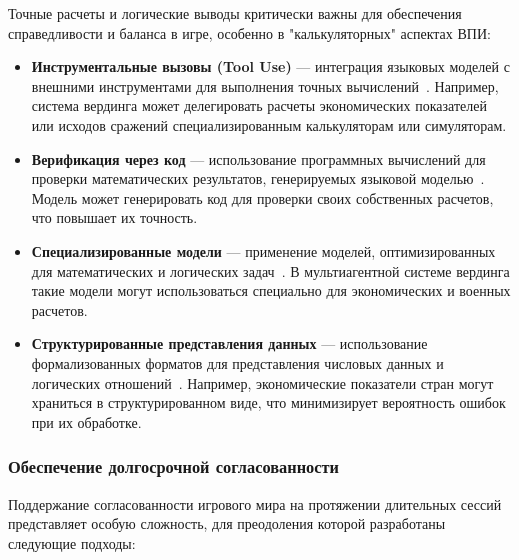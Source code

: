 Точные расчеты и логические выводы критически важны для обеспечения справедливости и баланса в игре, особенно в "калькуляторных" аспектах ВПИ:

\begin{itemize}
    \item \textbf{Инструментальные вызовы (Tool Use)} — интеграция языковых моделей с внешними инструментами для выполнения точных вычислений~\cite{schick2023toolformer}. Например, система вердинга может делегировать расчеты экономических показателей или исходов сражений специализированным калькуляторам или симуляторам.

    \item \textbf{Верификация через код} — использование программных вычислений для проверки математических результатов, генерируемых языковой моделью~\cite{cobbe2021training}. Модель может генерировать код для проверки своих собственных расчетов, что повышает их точность.

    \item \textbf{Специализированные модели} — применение моделей, оптимизированных для математических и логических задач~\cite{lewkowycz2022solving}. В мультиагентной системе вердинга такие модели могут использоваться специально для экономических и военных расчетов.

    \item \textbf{Структурированные представления данных} — использование формализованных форматов для представления числовых данных и логических отношений~\cite{ling2017program}. Например, экономические показатели стран могут храниться в структурированном виде, что минимизирует вероятность ошибок при их обработке.
\end{itemize}

\subsubsection{Обеспечение долгосрочной согласованности}

Поддержание согласованности игрового мира на протяжении длительных сессий представляет особую сложность, для преодоления которой разработаны следующие подходы:

